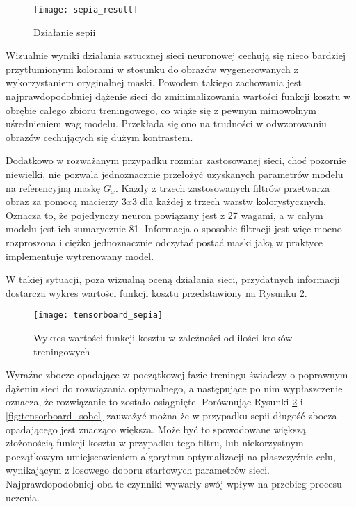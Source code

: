     \begin{figure}[H]
      \centering
      \texttt{[image: sepia\_result]}
      \caption[Działanie sepii - źródło: Rysunek własny]{Działanie sepii}
      \label{fig:sepia_result}
    \end{figure}

    Wizualnie wyniki działania sztucznej sieci neuronowej cechują się nieco bardziej
    przytłumionymi kolorami w stosunku do obrazów wygenerowanych z wykorzystaniem
    oryginalnej maski. Powodem takiego zachowania jest najprawdopodobniej dążenie
    sieci do zminimalizowania wartości funkcji kosztu w obrębie całego zbioru
    treningowego, co wiąże się z pewnym mimowolnym uśrednieniem wag modelu. Przekłada
    się ono na trudności w odwzorowaniu obrazów cechujących się dużym kontrastem.

    Dodatkowo w rozważanym przypadku rozmiar zastosowanej sieci, choć pozornie
    niewielki, nie pozwala jednoznacznie przełożyć uzyskanych parametrów modelu na
    referencyjną maskę $G_x$. Każdy z trzech zastosowanych filtrów przetwarza
    obraz za pomocą macierzy $3x3$ dla każdej z trzech warstw kolorystycznych.
    Oznacza to, że pojedynczy neuron powiązany jest z 27 wagami, a w całym modelu
    jest ich sumarycznie 81. Informacja o sposobie filtracji jest więc mocno
    rozproszona i ciężko jednoznacznie odczytać postać maski jaką w praktyce
    implementuje wytrenowany model.

    W takiej sytuacji, poza wizualną oceną działania sieci, przydatnych informacji
    dostarcza wykres wartości funkcji kosztu przedstawiony na Rysunku \ref{fig:tensorboard_sepia}.

    \begin{figure}[H]
      \centering
      \texttt{[image: tensorboard\_sepia]}
      \caption[Wykres wartości funkcji kosztu w zależności od ilości kroków treningowych - źródło: Rysunek własny]{Wykres wartości funkcji kosztu w zależności od ilości kroków treningowych}
      \label{fig:tensorboard_sepia}
    \end{figure}

    Wyraźne zbocze opadające w początkowej fazie treningu świadczy o poprawnym dążeniu
    sieci do rozwiązania optymalnego, a następujące po nim wypłaszczenie oznacza, że
    rozwiązanie to zostało osiągnięte. Porównując Rysunki \ref{fig:tensorboard_sepia}
    i \ref{fig:tensorboard_sobel} zauważyć można że w przypadku sepii długość zbocza
    opadającego jest znacząco większa. Może być to spowodowane większą złożonością
    funkcji kosztu w przypadku tego filtru, lub niekorzystnym początkowym umiejscowieniem
    algorytmu optymalizacji na płaszczyźnie celu, wynikającym z losowego doboru startowych parametrów sieci.
    Najprawdopodobniej oba te czynniki wywarły swój wpływ na przebieg procesu uczenia.

